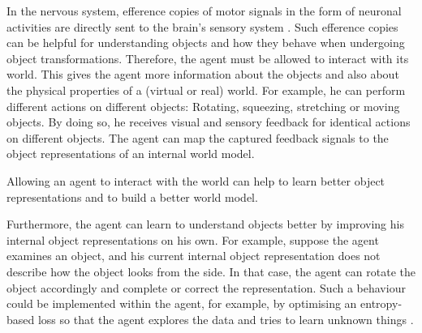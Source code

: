 In the nervous system, efference copies of motor signals in the form of neuronal activities are directly sent to the brain’s sensory system .
Such efference copies can be helpful for understanding objects and how they behave when undergoing object transformations.
Therefore, the agent must be allowed to interact with its world.
This gives the agent more information about the objects and also about the physical properties of a (virtual or real) world. For example, he can perform different actions on different objects: Rotating, squeezing, stretching or moving objects. By doing so, he receives visual and sensory feedback for identical actions on different objects.
The agent can map the captured feedback signals to the object representations of an internal world model.

\begin{claim}
	Allowing an agent to interact with the world can help to learn better object representations and to build a better world model.
\end{claim}

Furthermore, the agent can learn to understand objects better by improving his internal object representations on his own. For example, suppose the agent examines an object, and his current internal object representation does not describe how the object looks from the side. In that case, the agent can rotate the object accordingly and complete or correct the representation. 
Such a behaviour could be implemented within the agent, for example, by optimising an entropy-based loss so that the agent explores the data and tries to learn unknown things .

